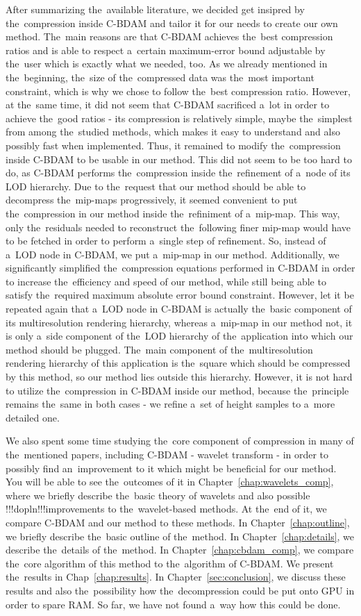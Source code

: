 After summarizing the~available literature, we decided get insipred by the~compression inside C-BDAM and tailor it for our needs to create our own method. The~main reasons are that C-BDAM achieves the~best compression ratios and is able to respect a~certain maximum-error bound adjustable by the~user which is exactly what we needed, too. As we already mentioned in the~beginning, the~size of the~compressed data was the~most important constraint, which is why we chose to follow the~best compression ratio. However, at the~same time, it did not seem that C-BDAM sacrificed a~lot in order to achieve the~good ratios - its compression is relatively simple, maybe the~simplest from among the~studied methods, which makes it easy to understand and also possibly fast when implemented. Thus, it remained to modify the~compression inside C-BDAM to be usable in our method. This did not seem to be too hard to do, as C-BDAM performs the~compression inside the~refinement of a~node of its LOD hierarchy. Due to the~request that our method should be able to decompress the~mip-maps progressively, it seemed convenient to put the~compression in our method inside the~refiniment of a~mip-map. This way, only the~residuals needed to reconstruct the~following finer mip-map would have to be fetched in order to perform a~single step of refinement. So, instead of a~LOD node in C-BDAM, we put a~mip-map in our method.  Additionally, we significantly simplified the~compression equations performed in C-BDAM in order to increase the~efficiency and speed of our method, while still being able to satisfy the~required maximum absolute error bound constraint. However, let it be repeated again that a~LOD node in C-BDAM is actually the~basic component of its multiresolution rendering hierarchy, whereas a~mip-map in our method not, it is only a~side component of the~LOD hierarchy of the~application into which our method should be plugged. The~main component of the~multiresolution rendering hierarchy of this application is the~square which should be compressed by this method, so our method lies outside this hierarchy. However, it is not hard to utilize the~compression in C-BDAM inside our method, because the~principle remains the~same in both cases - we refine a~set of height samples to a~more detailed one.

We also spent some time studying the~core component of compression in many of the~mentioned papers, including C-BDAM - wavelet transform - in order to possibly find an~improvement to it which might be beneficial for our method. You will be able to see the~outcomes of it in Chapter~\ref{chap:wavelets_comp}, where we briefly describe the~basic theory of wavelets and also possible !!!dopln!!!improvements to the~wavelet-based methods. At the~end of it, we compare C-BDAM and our method to these methods. In Chapter~\ref{chap:outline}, we briefly describe the~basic outline of the~method. In Chapter~\ref{chap:details}, we describe the~details of the~method. In Chapter~\ref{chap:cbdam_comp}, we compare the~core algorithm of this method to the~algorithm of C-BDAM. We present the~results in Chap~\ref{chap:results}. In Chapter~\ref{sec:conclusion}, we discuss these results and also the~possibility how the~decompression could be put onto GPU in order to spare RAM. So far, we have not found a~way how this could be done.
